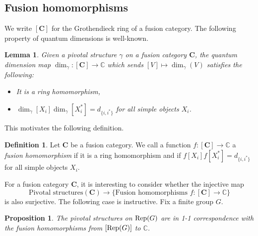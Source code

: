 \documentclass[a4paper]{article}
\theoremstyle{plain}
\newtheorem{lem}[thm]{Lemma}
\newtheorem{prop}[thm]{Proposition}
\theoremstyle{definition}
\newtheorem{defn}[thm]{Definition}
\newcommand{\Rep}{\operatorname{\text{\rm Rep}}}
\newcommand{\cat}{\mathbf}
\begin{document}
\subsection{Fusion homomorphisms}
We write $[\cat{C}]$ for the Grothendieck ring of a fusion category. The following property of quantum dimensions is well-known.
\begin{lem} Given a pivotal structure $\gamma$ on a fusion category $\cat{C}$, the quantum dimension map $\dim_{\gamma} \colon [\cat{C}] \rightarrow
\mathbb{C}$ which sends $[V] \mapsto \dim_\gamma (V)$ satisfies the following:
 \begin{itemize}
  \item It is a ring homomorphism,
  \item $\dim_\gamma [X_i] \dim_\gamma [X_i^*] = d_{\{i,i^*\}}$ for all
simple objects $X_i$.
 \end{itemize}
\end{lem}
This motivates the following definition.
\begin{defn} Let $\cat{C}$ be a fusion category. We call a function $f \colon [\cat{C}] \rightarrow \mathbb{C}$ a {\em fusion homomorphism} if it is a ring homomorphism and if $f[X_i]
f[X_i^*] = d_{\{i,i^*\}}$ for all simple objects $X_i$. 
\end{defn}
For a fusion category $\cat{C}$, it is interesting to consider whether the injective map
\[
 \text{Pivotal structures}(\cat{C}) \rightarrow \{\text{Fusion homomorphisms $f : [\cat{C}] \rightarrow \mathbb{C}$}\}
\]
is also surjective. The following case is instructive. Fix a finite group $G$.
\begin{prop} The pivotal structures on $\Rep(G)$ are in 1-1 correspondence
with the fusion homomorphisms from $[\Rep(G)]$ to $\mathbb{C}$.
\end{prop}
\end{document}
